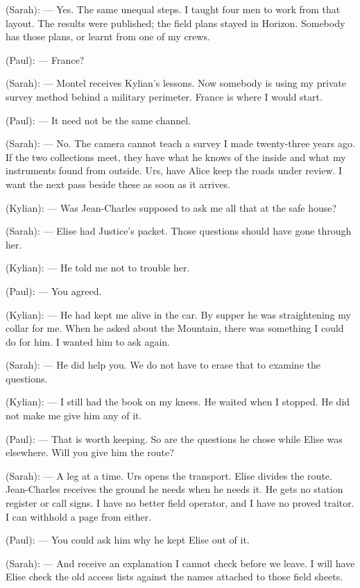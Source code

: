 \begin{room}
(Sarah): --- Yes. The same unequal steps. I taught four men to work from that layout. The results were published; the field plans stayed in Horizon. Somebody has those plans, or learnt from one of my crews.

(Paul): --- France?

(Sarah): --- Montel receives Kylian's lessons. Now somebody is using my private survey method behind a military perimeter. France is where I would start.

(Paul): --- It need not be the same channel.

(Sarah): --- No. The camera cannot teach a survey I made twenty-three years ago. If the two collections meet, they have what he knows of the inside and what my instruments found from outside. Urs, have Alice keep the roads under review. I want the next pass beside these as soon as it arrives.

(Kylian): --- Was Jean-Charles supposed to ask me all that at the safe house?

(Sarah): --- Elise had Justice's packet. Those questions should have gone through her.

(Kylian): --- He told me not to trouble her.

(Paul): --- You agreed.

(Kylian): --- He had kept me alive in the car. By supper he was straightening my collar for me. When he asked about the Mountain, there was something I could do for him. I wanted him to ask again.

(Sarah): --- He did help you. We do not have to erase that to examine the questions.

(Kylian): --- I still had the book on my knees. He waited when I stopped. He did not make me give him any of it.

(Paul): --- That is worth keeping. So are the questions he chose while Elise was elsewhere. Will you give him the route?

(Sarah): --- A leg at a time. Urs opens the transport. Elise divides the route. Jean-Charles receives the ground he needs when he needs it. He gets no station register or call signs. I have no better field operator, and I have no proved traitor. I can withhold a page from either.

(Paul): --- You could ask him why he kept Elise out of it.

(Sarah): --- And receive an explanation I cannot check before we leave. I will have Elise check the old access lists against the names attached to those field sheets.


\end{room}
